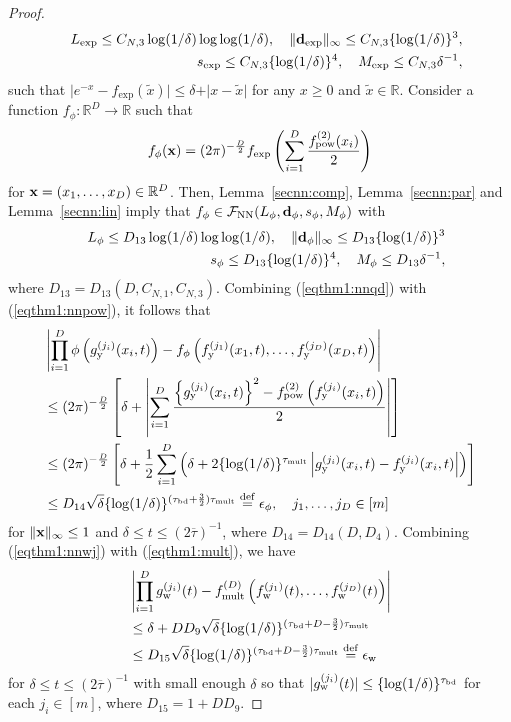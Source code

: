 \documentclass[twoside,11pt]{article}
\def\cF{\mathcal F}
\newcommand{\bd}{{\bf d}}
\newcommand{\bx}{{\bf x}}
\newcommand{\bbR}{{\mathbb R}}
\newcommand{\be}{\begin{equation}}
\newcommand{\ee}{\end{equation}}
\newcommand{\bean}{\setlength\arraycolsep{1pt}\begin{eqnarray*}}
\newcommand{\eean}{\end{eqnarray*}}
\def\defeq{ \stackrel{\rm def}{=} }
\begin{document}
\begin{proof}
\bean
&& L_{\exp} \leq C_{N,3} \log(1/\delta) \log \log (1/\delta), \quad \|\bd_{\exp}\|_{\infty} \leq C_{N,3} \{\log(1/\delta)\}^{3},
\\
&& s_{\exp} \leq C_{N,3} \{\log(1/\delta)\}^{4}, \quad M_{\exp} \leq C_{N,3} \delta^{-1},
\eean
such that $\vert e^{-x} - f_{\exp}(\widetilde x) \vert \leq \delta + \vert x - \widetilde x \vert$ for any $x \geq 0$ and $\widetilde x \in \bbR$.
Consider a function $f_{\phi} : \bbR^{D} \to \bbR$ such that
\bean
f_{\phi}(\bx) = (2\pi)^{-\frac{D}{2}}f_{\exp}\left( \sum_{i=1}^{D} \frac{f_{\rm pow}^{(2)}(x_i)}{2}  \right)
\eean
for $\bx = (x_1,\ldots,x_{D}) \in \bbR^{D}$.
Then, Lemma~\ref{secnn:comp}, Lemma~\ref{secnn:par} and Lemma~\ref{secnn:lin} imply that
$f_{\phi} \in \cF_{\rm NN}(L_{\phi}, \bd_{\phi}, s_{\phi}, M_{\phi} )$ with
\bean 
&& L_{\phi} \leq D_{13} \log(1/\delta) \log \log (1/\delta), 
\quad \| \bd_{\phi} \|_{\infty}
\leq  D_{13} \{ \log(1/\delta) \}^{3}
\\
&& s_{\phi} 
\leq  D_{13} \{ \log(1/\delta) \}^{4}, 
\quad M_{\phi}  \leq   D_{13} \delta^{-1},
\eean
where $D_{13} = D_{13}(D, C_{N,1}, C_{N,3})$.
Combining (\ref{eqthm1:nnqd}) with (\ref{eqthm1:nnpow}), it follows that
\be \begin{split}
& \left\vert \prod_{i=1}^{D} \phi \left(g_{\rm y}^{(j_i)}(x_i,t) \right)  - f_{\phi}\left(f_{\rm y}^{(j_1)}(x_1,t),\ldots,f_{\rm y}^{(j_D)}(x_D,t)  \right) \right\vert
\\
& \leq (2\pi)^{-\frac{D}{2}} \left[ \delta + \left\vert \sum_{i=1}^{D} \frac{ \left\{g_{\rm y}^{(j_i)}(x_i,t) \right\}^2 - f_{\rm pow}^{(2)}\left( f_{\rm y}^{(j_i)}(x_i,t) \right)  }{2} \right\vert \right]
\\
& \leq (2\pi)^{-\frac{D}{2}} \left[  \delta + \frac{1}{2} \sum_{i=1}^{D} \left( \delta + 2\{ \log(1/\delta)\}^{\tau_{\rm mult}} \left\vert g_{\rm y}^{(j_i)}(x_i,t) - f_{\rm y}^{(j_i)}(x_i,t) \right\vert   \right) \right]
\\
& \leq D_{14} \sqrt{\delta} \{ \log(1/\delta)\}^{(\tau_{\rm bd}+\frac{3}{2} )\tau_{\rm mult}}  \defeq \epsilon_{\phi}, \quad j_1,\ldots,j_{D} \in [m] \label{eqthm1:nnpsi}
\end{split}
\ee
for $\|\bx\|_{\infty} \leq 1$ and $\delta \leq t \leq (2\overline{\tau})^{-1}$, where $D_{14} = D_{14}(D,D_{4})$.
Combining (\ref{eqthm1:nnwj}) with (\ref{eqthm1:mult}), we have
\be \begin{split}
& \left\vert \prod_{i=1}^{D} g_{\rm w}^{(j_i)}(t) - f_{\rm mult}^{(D)}\left( f_{\rm w}^{(j_1)}(t),\ldots,f_{\rm w}^{(j_D)}(t) \right)  \right\vert
\\
& \leq \delta + D D_{9} \sqrt{\delta} \{\log (1/\delta) \}^{( \tau_{\rm bd} + D - \frac{3}{2}) \tau_{\rm mult} }
\\
&
 \leq D_{15}  \sqrt{\delta} \{\log (1/\delta) \}^{ ( \tau_{\rm bd} + D - \frac{3}{2}) \tau_{\rm mult}  } \defeq \epsilon_{\rm w} \label{eqthm1:nnwprod}
\end{split} \ee
for $\delta \leq t \leq (2\overline{\tau})^{-1}$ with small enough $\delta$ so that $\vert g_{\rm w}^{(j_i)}(t) \vert \leq \{ \log (1/\delta)\}^{\tau_{\rm bd}}$ for each $j_i \in [m]$, where $D_{15} = 1+DD_{9}$.


\end{proof}
\end{document}
